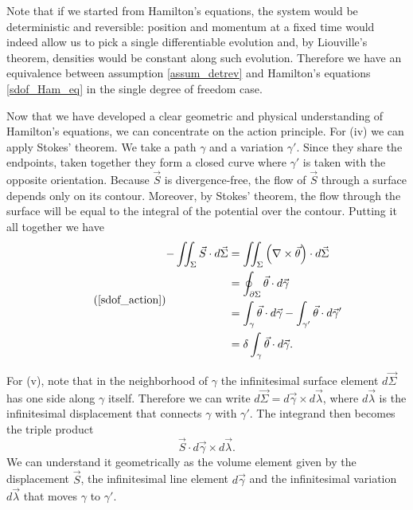 \documentclass[10pt,twocolumn, nofootinbib]{revtex4-2}
\begin{document}
Note that if we started from Hamilton's equations, the system would be deterministic and reversible: position and momentum at a fixed time would indeed allow us to pick a single differentiable evolution and, by Liouville's theorem, densities would be constant along such evolution. Therefore we have an equivalence between assumption \ref{assum_detrev} and Hamilton's equations \ref{sdof_Ham_eq} in the single degree of freedom case.

Now that we have developed a clear geometric and physical understanding of Hamilton's equations, we can concentrate on the action principle. For (iv) we can apply Stokes' theorem. We take a path $\gamma$ and a variation $\gamma'$. Since they share the endpoints, taken together they form a closed curve where $\gamma'$ is taken with the opposite orientation. Because $\vec{S}$ is divergence-free, the flow of $\vec{S}$ through a surface depends only on its contour. Moreover, by Stokes' theorem, the flow through the surface will be equal to the integral of the potential over the contour. Putting it all together we have
\begin{equation}
\tag*{(\ref{sdof_action})}
\begin{aligned}
	- \iint_{\Sigma} \vec{S} \cdot d\vec{\Sigma} &=
	\iint_{\Sigma} \left( \nabla \times \vec{\theta} \right) \cdot d\vec{\Sigma} \\
	&= \oint_{\partial \Sigma} \vec{\theta}  \cdot d\vec{\gamma} \\
	&= \int_{\gamma} \vec{\theta} \cdot d\vec{\gamma} - \int_{\gamma'} \vec{\theta} \cdot d\vec{\gamma}' \\
	&= \delta \int_{\gamma} \vec{\theta} \cdot d\vec{\gamma}.
\end{aligned}
\end{equation}

For (v), note that in the neighborhood of $\gamma$ the infinitesimal surface element $d\vec{\Sigma}$ has one side along $\gamma$ itself. Therefore we can write $d\vec{\Sigma} = d\vec{\gamma} \times d\vec{\lambda}$, where $d\vec{\lambda}$ is the infinitesimal displacement that connects $\gamma$ with $\gamma'$. The integrand then becomes the triple product
\begin{equation}
	\vec{S} \cdot d\vec{\gamma} \times d\vec{\lambda}.
\end{equation}
We can understand it geometrically as the volume element given by the displacement $\vec{S}$, the infinitesimal line element $d\vec{\gamma}$ and the infinitesimal variation $d\vec{\lambda}$ that moves $\gamma$ to $\gamma'$.
\end{document}
